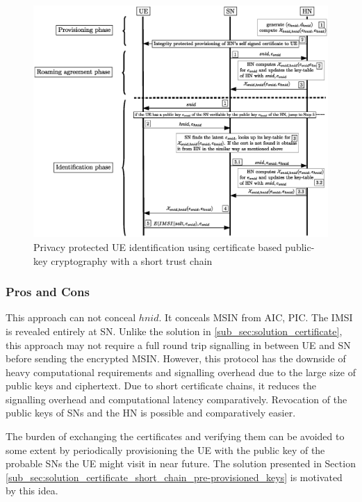 \documentclass[runningheads,a4paper]{llncs} %
\begin{document}
\begin{figure}
\begin{center}
  \includegraphics[width=.98\textwidth]{root-key2.eps}
\caption{Privacy protected UE identification using certificate based public-key cryptography with a short trust chain}
\label{fig:solution_certificate_short_chain}       %
\end{center}
\end{figure}

\subsubsection{Pros and Cons}
This approach can not conceal $hnid$. It conceals MSIN from AIC, PIC. The IMSI is revealed entirely at SN. Unlike the solution in \ref{sub_sec:solution_certificate}, this approach may not require a full round trip signalling in between UE and SN before sending the encrypted MSIN. However, this protocol has the downside of heavy computational requirements and signalling overhead due to the large size of public keys and ciphertext. Due to short certificate chains, it reduces the signalling overhead and computational latency comparatively. Revocation of the public keys of SNs and the HN is possible and comparatively easier. 

The burden of exchanging the certificates and verifying them can be avoided to some extent by periodically provisioning the UE with the public key of the probable SNs the UE might visit in near future. The solution presented in Section \ref{sub_sec:solution_certificate_short_chain_pre-provisioned_keys} is motivated by this idea.
\end{document}
